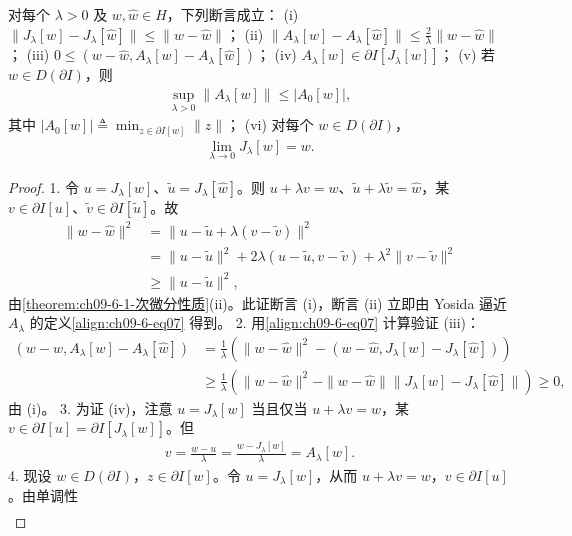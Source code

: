 \documentclass[../../main.tex]{subfiles}
\begin{document}
\begin{theorem}\label{theorem:ch09-6-2-Jlambda性质}
对每个 $\lambda>0$ 及 $w,\widehat{w}\in H$，下列断言成立：
(i) $\|J_\lambda[w]-J_\lambda[\widehat{w}]\|\leqslant\|w-\widehat{w}\|$；
(ii) $\|A_\lambda[w]-A_\lambda[\widehat{w}]\|\leqslant\frac2\lambda\|w-\widehat{w}\|$；
(iii) $0\leqslant(w-\widehat{w},A_\lambda[w]-A_\lambda[\widehat{w}])$；
(iv) $A_\lambda[w]\in\partial I[J_\lambda[w]]$；
(v) 若 $w\in D(\partial I)$，则
\begin{align*}
\sup_{\lambda>0}\|A_\lambda[w]\|\leqslant|A_0[w]|,
\end{align*}
其中 $|A_0[w]|\triangleq\min_{z\in\partial I[w]}\|z\|$；
(vi) 对每个 $w\in D(\partial I)$，
\begin{align*}
\lim_{\lambda\to 0}J_\lambda[w]=w.
\end{align*}
\begin{proof}
1. 令 $u=J_\lambda[w]$、$\widetilde{u}=J_\lambda[\widehat{w}]$。则 $u+\lambda v=w$、$\widetilde{u}+\lambda\widetilde{v}=\widehat{w}$，某 $v\in\partial I[u]$、$\widetilde{v}\in\partial I[\widetilde{u}]$。故
\begin{align*}
\|w-\widehat{w}\|^2&=\|u-\widetilde{u}+\lambda(v-\widetilde{v})\|^2\\
&=\|u-\widetilde{u}\|^2+2\lambda(u-\widetilde{u},v-\widetilde{v})+\lambda^2\|v-\widetilde{v}\|^2\\
&\geqslant\|u-\widetilde{u}\|^2,
\end{align*}
由\cref{theorem:ch09-6-1-次微分性质}(ii)。此证断言 (i)，断言 (ii) 立即由 Yosida 逼近 $A_\lambda$ 的定义\eqref{align:ch09-6-eq07} 得到。
2. 用\eqref{align:ch09-6-eq07} 计算验证 (iii)：
\begin{align*}
(w-\widehat{w},A_\lambda[w]-A_\lambda[\widehat{w}])&=\frac1\lambda\left(\|w-\widehat{w}\|^2-(w-\widehat{w},J_\lambda[w]-J_\lambda[\widehat{w}])\right)\\
&\geqslant\frac1\lambda\left(\|w-\widehat{w}\|^2-\|w-\widehat{w}\|\|J_\lambda[w]-J_\lambda[\widehat{w}]\|\right)\geqslant 0,
\end{align*}
由 (i)。
3. 为证 (iv)，注意 $u=J_\lambda[w]$ 当且仅当 $u+\lambda v=w$，某 $v\in\partial I[u]=\partial I[J_\lambda[w]]$。但
\begin{align*}
v=\frac{w-u}\lambda=\frac{w-J_\lambda[w]}\lambda=A_\lambda[w].
\end{align*}
4. 现设 $w\in D(\partial I)$，$z\in\partial I[w]$。令 $u=J_\lambda[w]$，从而 $u+\lambda v=w$，$v\in\partial I[u]$。由单调性
\begin{align*}

\end{align*}
\end{proof}
\end{theorem}
\end{document}
